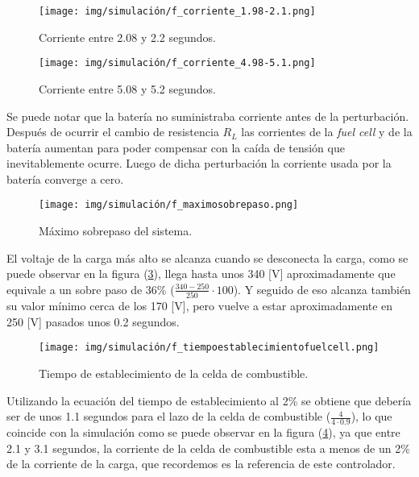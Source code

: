 \begin{figure}[H]
    \centering
    \texttt{[image: img/simulación/f\_corriente\_1.98-2.1.png]}
    \caption{Corriente entre 2.08 y 2.2 segundos.}
    \label{fig:f_corriente_1.98-2.1}
\end{figure}

\begin{figure}[H]
    \centering
    \texttt{[image: img/simulación/f\_corriente\_4.98-5.1.png]}
    \caption{Corriente entre 5.08 y 5.2 segundos.}
\label{fig:f_corriente_4.98-5.1}
\end{figure}

Se puede notar que la batería no suministraba corriente antes de la perturbación. 
Después de ocurrir el cambio de resistencia $R_L$ las corrientes de la \textit{fuel cell} y de
la batería aumentan para poder compensar con la caída de tensión que inevitablemente ocurre. 
Luego de dicha perturbación la corriente usada por la batería converge a cero. 

\begin{figure}[H]
    \centering
    \texttt{[image: img/simulación/f\_maximosobrepaso.png]}
    \caption{Máximo sobrepaso del sistema.}
\label{fig:f_maximosobrepaso}
\end{figure}

El voltaje de la carga más alto se alcanza cuando se desconecta la carga, como se puede observar 
en la figura (\ref{fig:f_maximosobrepaso}), llega hasta unos 340 [V] aproximadamente
que equivale a un sobre paso de 36\% ($\frac{340-250}{250} \cdot 100$). Y seguido de eso alcanza 
también su valor mínimo cerca de los 170 [V], pero vuelve a estar aproximadamente en 250 [V]
pasados unos 0.2 segundos.

\begin{figure}[H]
    \centering
    \texttt{[image: img/simulación/f\_tiempoestablecimientofuelcell.png]}
    \caption{Tiempo de establecimiento de la celda de combustible.}
    \label{fig:f_tiempoestablecimientofuelcell}
\end{figure}

Utilizando la ecuación del tiempo de establecimiento al 2\% se obtiene que debería ser de unos
1.1 segundos para el lazo de la celda de combustible ($\frac{4}{4\cdot0.9}$), lo que coincide con la simulación
como se puede observar en la figura (\ref{fig:f_tiempoestablecimientofuelcell}), ya que entre 
2.1 y 3.1 segundos, la corriente de la celda de combustible esta a menos de un 2\% de la corriente de la 
carga, que recordemos es la referencia de este controlador.

